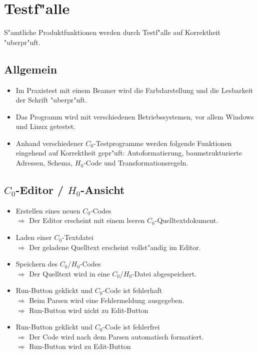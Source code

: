 \section{Testf"alle}

S"amtliche Produktfunktionen werden durch Testf"alle auf Korrektheit "uberpr"uft.

	\subsection{Allgemein}
	\begin{itemize}
		\item Im Praxistest mit einem Beamer wird die Farbdarstellung und die Lesbarkeit der Schrift "uberpr"uft.
		\item Das Programm wird mit verschiedenen Betriebssystemen, vor allem Windows und Linux getestet.
		\item Anhand verschiedener $C_0$-Testprogramme werden folgende Funktionen eingehend auf Korrektheit gepr"uft: Autoformatierung, baumstrukturierte Adressen, Schema, $H_0$-Code und Transformationsregeln.
	\end{itemize}
	
	\subsection{$C_0$-Editor / $H_0$-Ansicht}
	\begin{itemize}
    \item Erstellen eines neuen $C_0$-Codes \\
    $\Rightarrow$ Der Editor erscheint mit einem leeren $C_0$-Quelltextdokument.
		\item Laden einer $C_0$-Textdatei \\
		$\Rightarrow$ Der geladene Quelltext erscheint vollst"andig im Editor.
		\item Speichern des $C_0$/$H_0$-Codes \\
		$\Rightarrow$ Der Quelltext wird in eine $C_0$/$H_0$-Datei abgespeichert.
		\item Run-Button geklickt und $C_0$-Code ist fehlerhaft \\
		$\Rightarrow$ Beim Parsen wird eine Fehlermeldung ausgegeben. \\
		$\Rightarrow$ Run-Button wird nicht zu Edit-Button
		\item Run-Button geklickt und $C_0$-Code ist fehlerfrei \\
		$\Rightarrow$ Der Code wird nach dem Parsen automatisch formatiert. \\
		$\Rightarrow$ Run-Button wird zu Edit-Button
	\end{itemize}

